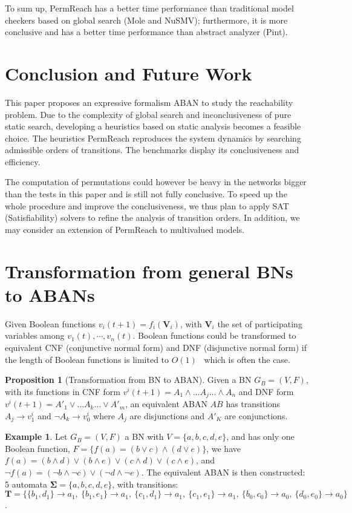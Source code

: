 \documentclass{article}
\newcommand{\acm}[3]{\{#1\}\rightarrow#3}
\theoremstyle{definition}
\newtheorem{example}{Example}
\newtheorem{proposition}{Proposition}
\begin{document}
To sum up, PermReach has a better time performance than traditional model checkers based on global search (Mole and NuSMV); furthermore, it is more conclusive and has a better time performance than abstract analyzer (Pint).

\section{Conclusion and Future Work}\label{sect:6}
This paper proposes an expressive formalism ABAN to study the reachability problem. 
Due to the complexity of global search and inconclusiveness of pure static search, developing a heuristics based on static analysis becomes a feasible choice.
The heuristics PermReach reproduces the system dynamics by searching admissible orders of transitions.
The benchmarks display its conclusiveness and efficiency.

The computation of permutations could however be heavy in the networks bigger than the tests in this paper and is still not fully conclusive. 
To speed up the whole procedure and improve the conclusiveness, we thus plan to apply SAT (Satisfiability) solvers to refine the analysis of transition orders. 
In addition, we may consider an extension of PermReach to multivalued models.



\appendix
\section{Transformation from general BNs to ABANs}\label{appendix:trans}

Given Boolean functions $v_i(t+1)=f_i(\mathbf{V}_i)$, with $\mathbf{V}_i$ the set of participating variables among $v_1(t),\cdots,v_n(t)$.
Boolean functions could be transformed to equivalent CNF (conjunctive normal form) and DNF (disjunctive normal form) if the length of Boolean functions is limited to $O(1)$~\cite{miltersen2005converting} which is often the case.
\begin{proposition}[Transformation from BN to ABAN]
Given a BN $G_B=(V,F)$, with its functions in CNF form $v^i(t+1)=A_1\land\ldots A_j \ldots\land A_n$ and DNF form $v^i(t+1)=A'_1\lor\ldots A_k\ldots\lor A'_m$, an equivalent ABAN $AB$ has transitions $A_j\to v^i_1$ and $\lnot A_k\to v^i_0$ where $A_j$ are disjunctions and $A'_K$ are conjunctions.
\end{proposition}
\begin{example}
Let $G_B=(V,F)$ a BN with $V=\{a,b,c,d,e\}$, and has only one Boolean function, $F=\{f(a)= (b\lor c)\land(d\lor e)\}$, we have 
$f(a)=(b\land d)\lor(b\land e)\lor(c\land d)\lor(c\land e)$, and $\lnot f(a)=(\lnot b\land \lnot c)\lor(\lnot d\land \lnot e)$. 
The equivalent ABAN is then constructed: 5 automata $\mathbf{\Sigma}=\{a,b,c,d,e\}$, with transitions: $\mathbf{T}=\{\acm{b_1,d_1}{a_0}{a_1},\ \acm{b_1,e_1}{a_0}{a_1},\ \acm{c_1,d_1}{a_0}{a_1},\ \acm{c_1,e_1}{a_0}{a_1},\ \acm{b_0,c_0}{a_1}{a_0},\ \acm{d_0,e_0}{a_1}{a_0}\}$.
\end{example}
\end{document}
